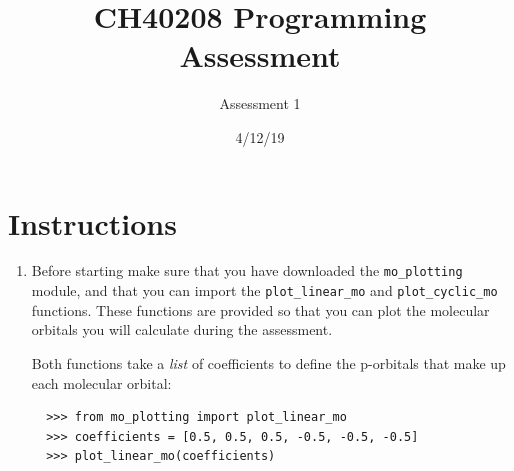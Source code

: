 \documentclass[a4paper]{article}
\title{CH40208 Programming Assessment}
\author{Assessment 1}
\date{4/12/19}
\begin{document}
\maketitle

\section*{Instructions}
\begin{enumerate}
  \item Before starting make sure that you have downloaded the \texttt{mo\_plotting} module, and that you can import the \texttt{plot\_linear\_mo} and \texttt{plot\_cyclic\_mo} functions. These functions are provided so that you can plot the molecular orbitals you will calculate during the assessment.

  Both functions take a \emph{list} of coefficients to define the p-orbitals that make up each molecular orbital:
  \begin{lstlisting}
  >>> from mo_plotting import plot_linear_mo
  >>> coefficients = [0.5, 0.5, 0.5, -0.5, -0.5, -0.5]
  >>> plot_linear_mo(coefficients)
  \end{lstlisting}



\end{enumerate}
\end{document}
